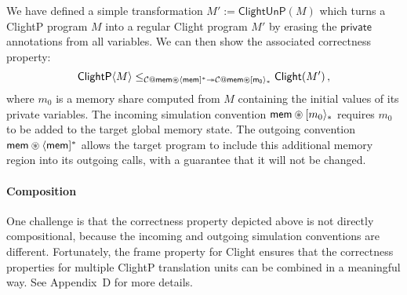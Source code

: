 \documentclass[acmsmall,screen,review,nonacm]{acmart}
\newcommand{\kw}[1]{\ensuremath{ \mathsf{#1} }}
\newcommand{\sepconj}{\oast}
\begin{document}
We have defined a simple transformation $M' := \kw{ClightUnP}(M)$
which turns a ClightP program $M$ into a regular Clight program $M'$
by erasing the $\kw{private}$ annotations from all variables.
We can then show the associated correctness property:
\[
  \kw{ClightP}\langle M \rangle \le_{
    \mathcal{C} \mathbin@ \kw{mem} \sepconj \langle \kw{mem} ]^*
    \twoheadrightarrow
    \mathcal{C} \mathbin@ \kw{mem} \sepconj [ \kw{m_0} \rangle_*}
  \kw{Clight}(M')
  \,,
\]
where $m_0$ is a memory share computed from $M$
containing the initial values of its private variables.
The incoming simulation convention $\kw{mem} \sepconj [m_0\rangle_*$
requires $m_0$ to be added to the target global memory state.
The outgoing convention $\kw{mem} \sepconj \langle \kw{mem} ]^*$
allows the target program to include this additional memory region
into its outgoing calls,
with a guarantee that it will not be changed.



\paragraph{Composition}

One challenge is that the correctness property depicted above
is not directly compositional,
because the incoming and outgoing simulation conventions are different.
Fortunately,
the frame property for Clight ensures that
the correctness properties for multiple ClightP translation units
can be combined in a meaningful way.
See Appendix~D for more details. %

\end{document}
